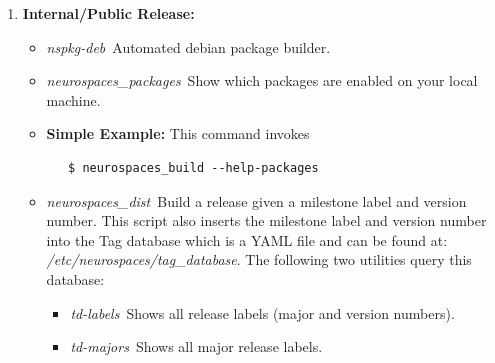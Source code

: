 \documentclass[12pt]{article}
\begin{document}
\begin{enumerate}
   \item {\bf Internal/Public Release:}
   \begin{itemize}
      \item {\it nspkg-deb}\,\,\,Automated debian package builder.
      \item {\it neurospaces\_packages}\,\,\,Show which packages are enabled on your local machine.
      \item{\bf Simple Example:} This command invokes 
      \begin{verbatim}
   $ neurospaces_build --help-packages
      \end{verbatim}
      \item {\it neurospaces\_dist}\,\,\,Build a release given a milestone label and version number. This script also inserts the milestone label and version number into the Tag database which is a YAML file and can be found at: {\it /etc/neurospaces/tag\_database}. The following two utilities query this database:
      \begin{itemize}
         \item {\it td-labels}\,\,\,Shows all release labels (major and version numbers).
         \item {\it td-majors}\,\,\,Shows all major release labels.
      \end{itemize}


\end{itemize}
\end{enumerate}
\end{document}
